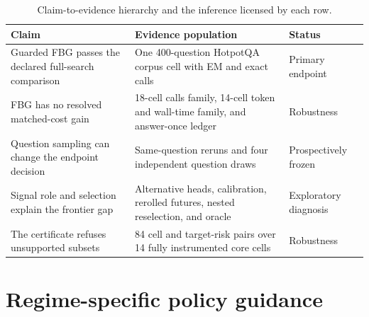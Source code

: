 \documentclass[manuscript,nonacm]{acmart}
\begin{document}
\begin{table}[H]
\caption{Claim-to-evidence hierarchy and the inference licensed by each row.}
\label{tab:hierarchy}
\footnotesize
\setlength{\tabcolsep}{3pt}
\begin{tabular}{p{}p{}p{}}
\toprule
Claim & Evidence population & Status \\
\midrule
Guarded FBG passes the declared full-search comparison & One 400-question
HotpotQA corpus cell with EM and exact calls & Primary endpoint \\
FBG has no resolved matched-cost gain & 18-cell calls family, 14-cell token
and wall-time family, and answer-once ledger & Robustness \\
Question sampling can change the endpoint decision & Same-question reruns and
four independent question draws & Prospectively frozen \\
Signal role and selection explain the frontier gap & Alternative heads,
calibration, rerolled futures, nested reselection, and oracle & Exploratory
diagnosis \\
The certificate refuses unsupported subsets & 84 cell and target-risk pairs
over 14 fully instrumented core cells & Robustness \\
\end{tabular}
\end{table}

\section{Regime-specific policy guidance}
\label{supp:headline-displays}
\end{document}
